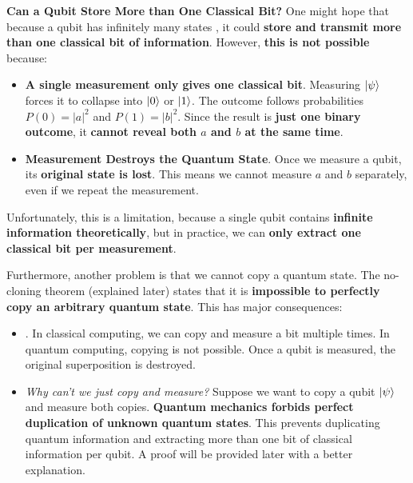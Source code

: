 \highspace
\textcolor{Green3}{ \textbf{Can a Qubit Store More than One Classical Bit?}} One might hope that because a qubit has infinitely many states
, it could \textbf{store and transmit more than one classical bit of information}. However, \textbf{this is not possible} because:
\begin{itemize}[label=\textcolor{Red2}{}]
    \item \textcolor{Red2}{\textbf{A single measurement only gives one classical bit}}. Measuring $| \psi \rangle$ forces it to collapse into $| 0 \rangle$ or $| 1 \rangle$. The outcome follows probabilities $P\left(0\right) = \left|a\right|^{2}$ and $P\left(1\right) = \left|b\right|^{2}$. Since the result is \textbf{just one binary outcome}, it \textbf{cannot reveal both $a$ and $b$ at the same time}.

    \item \textcolor{Red2}{\textbf{Measurement Destroys the Quantum State}}. Once we measure a qubit, its \textbf{original state is lost}. This means we cannot measure $a$ and $b$ separately, even if we repeat the measurement.
\end{itemize}
Unfortunately, this is a limitation, because a single qubit contains \textbf{infinite information theoretically}, but in practice, we can \textbf{only extract one classical bit per measurement}.

\newpage

\noindent
Furthermore, another problem is that we cannot copy a quantum state. The no-cloning theorem (explained later) states that it is \textbf{impossible to perfectly copy an arbitrary quantum state}. This has major consequences:
\begin{itemize}
    \item {}. In classical computing, we can copy and measure a bit multiple times. In quantum computing, copying is not possible. Once a qubit is measured, the original superposition is destroyed.

    \item \emph{Why can't we just copy and measure?} Suppose we want to copy a qubit $| \psi \rangle$ and measure both copies. \textbf{Quantum mechanics forbids perfect duplication of unknown quantum states}. This prevents duplicating quantum information and extracting more than one bit of classical information per qubit. A proof will be provided later with a better explanation.
\end{itemize}

